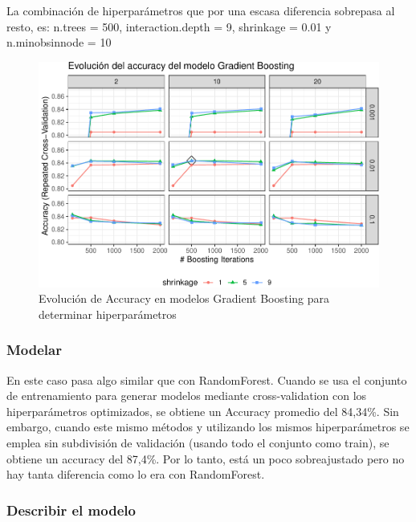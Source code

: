 La combinación de hiperparámetros
que por una escasa diferencia sobrepasa al resto, es: n.trees = 500,
interaction.depth = 9, shrinkage = 0.01 y n.minobsinnode = 10


\begin{figure}[!htb]
	\centering
	\includegraphics{imagenes/modelos_varios/unnamed-chunk-28-1.pdf}
	\caption{Evolución de Accuracy en modelos Gradient Boosting para determinar hiperparámetros}
	\label{fig:rf_hiperparam}
\end{figure}


\subsubsection{Modelar}

En este caso pasa algo similar que con RandomForest. Cuando se usa el conjunto de entrenamiento para generar modelos mediante cross-validation con los hiperparámetros optimizados, se obtiene un Accuracy promedio del 84,34\%. Sin embargo, cuando este mismo métodos y utilizando los mismos hiperparámetros se emplea sin subdivisión de validación (usando todo el conjunto como train), se obtiene un accuracy del 87,4\%. Por lo tanto, está un poco sobreajustado pero no hay tanta diferencia como lo era con RandomForest.





\subsubsection{Describir el modelo}

